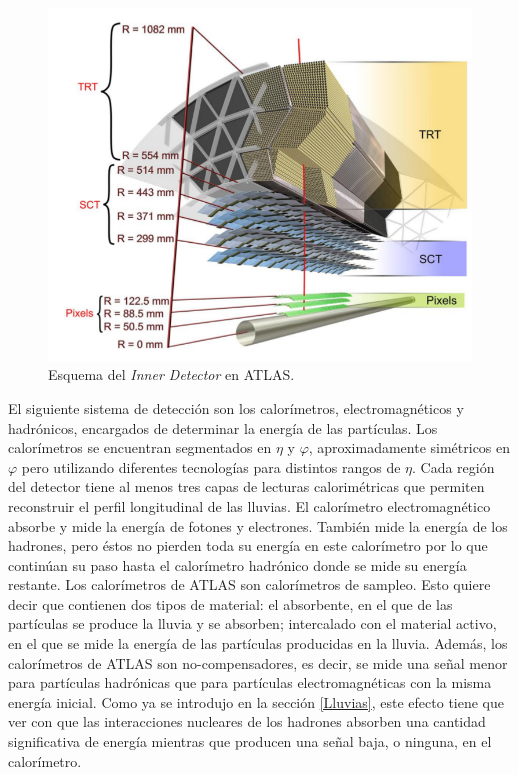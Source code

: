 \begin{figure}[h]
    \centering
    \includegraphics[width =0.6\linewidth]{images/ID}
    \caption{Esquema del \textit{Inner Detector} en ATLAS\cite{ID}.}
    \label{fig:ID}
\end{figure}

El siguiente sistema de detección son los calorímetros, electromagnéticos y hadrónicos, encargados de determinar la energía de las partículas. Los calorímetros se encuentran segmentados en $\eta$ y $\varphi$, aproximadamente simétricos en $\varphi$ pero utilizando diferentes tecnologías para distintos rangos de $\eta$. Cada región del detector tiene al menos tres capas de lecturas calorimétricas que permiten reconstruir el perfil longitudinal de las lluvias.   
El calorímetro electromagnético absorbe y mide la energía de fotones y electrones. También mide la energía de los hadrones, pero éstos no pierden toda su energía en este calorímetro por lo que continúan su paso hasta el calorímetro hadrónico donde se mide su energía restante. 
Los calorímetros de ATLAS son calorímetros de sampleo. Esto quiere decir que contienen dos tipos de material: el absorbente, en el que de las partículas se produce la lluvia y se absorben; intercalado con el material activo, en el que se mide la energía de las partículas producidas en la lluvia. Además, los calorímetros de ATLAS son no-compensadores, es decir, se mide una señal menor para partículas hadrónicas que para partículas electromagnéticas con la misma energía inicial. Como ya se introdujo en la sección \ref{Lluvias}, este efecto tiene que ver con que las interacciones nucleares de los hadrones absorben una cantidad significativa de energía mientras que producen una señal baja, o ninguna, en el calorímetro.\\  

